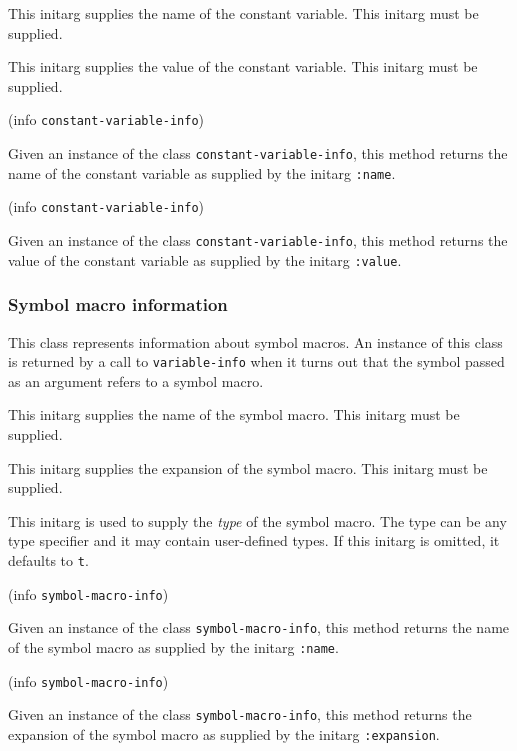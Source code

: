 This initarg supplies the name of the constant variable.  This initarg
must be supplied. 


This initarg supplies the value of the constant variable.  This
initarg must be supplied.

 {(info {\tt constant-variable-info})}

Given an instance of the class \texttt{constant-variable-info}, this
method returns the name of the constant variable as supplied by the
initarg \texttt{:name}.

 {(info {\tt constant-variable-info})}

Given an instance of the class \texttt{constant-variable-info}, this
method returns the value of the constant variable as supplied by the
initarg \texttt{:value}.

\subsubsection{Symbol macro information}


This class represents information about symbol macros.  An
instance of this class is returned by a call to \texttt{variable-info}
when it turns out that the symbol passed as an argument refers to a
symbol macro.


This initarg supplies the name of the symbol macro.  This initarg must
be supplied.


This initarg supplies the expansion of the symbol macro.  This initarg
must be supplied.


This initarg is used to supply the \emph{type} of the symbol macro.
The type can be any type specifier and it may contain user-defined
types.  If this initarg is omitted, it defaults to \texttt{t}.

 {(info {\tt symbol-macro-info})}

Given an instance of the class \texttt{symbol-macro-info}, this method
returns the name of the symbol macro as supplied by the initarg
\texttt{:name}.

 {(info {\tt symbol-macro-info})}

Given an instance of the class \texttt{symbol-macro-info}, this method
returns the expansion of the symbol macro as supplied by the initarg
\texttt{:expansion}.

